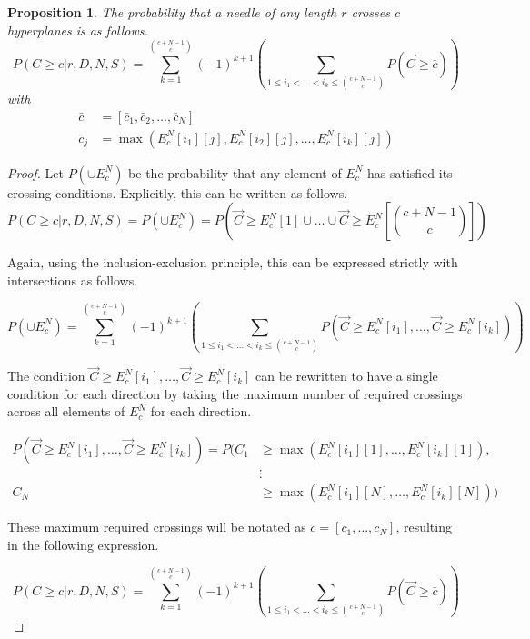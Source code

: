 \documentclass{article}
\newtheorem{proposition}{Proposition}
\begin{document}
\begin{proposition} \label{p:inclusive-exclusive needle crossing}
	The probability that a needle of any length $r$ crosses $c$ hyperplanes is as follows.
	\begin{equation}
		P(C\ge c|r,D,N,S) = \sum_{k=1}^{c+N-1\choose c} (-1)^{k+1}\left(\sum_{1\le i_1 < \hdots < i_k \le {c+N-1\choose c}}P(\vec{C}\ge\bar{c}) \right)
	\end{equation}
	with
	\begin{align}
		\bar{c}&=[\bar{c}_1, \bar{c}_2, \hdots, \bar{c}_N] \\
		\bar{c}_j &= \max(E_c^N[i_1][j], E_c^N[i_2][j], \hdots, E_c^N[i_k][j])
	\end{align}
\end{proposition}
\begin{proof}
	Let $P(\cup E_c^N)$ be the probability that any element of $E_c^N$ has satisfied its crossing conditions.
	Explicitly, this can be written as follows.
	\begin{equation}
		P(C\ge c|r, D, N, S) = P(\cup E_c^N) = P\left(\vec{C} \ge E_c^N[1] \cup \hdots \cup \vec{C} \ge E_c^N\left[{c+N-1 \choose c}\right]\right)
	\end{equation}

	Again, using the inclusion-exclusion principle, this can be expressed strictly with intersections as follows.

	\begin{equation}
		P(\cup E_c^N) = \sum_{k=1}^{c+N-1\choose c} (-1)^{k+1}\left(\sum_{1\le i_1 < \hdots < i_k \le {c+N-1\choose c}}P(\vec{C}\ge E_c^N[i_1] , \hdots , \vec{C}\ge E_c^N[i_k]) \right)
	\end{equation}

	The condition $\vec{C}\ge E_c^N[i_1], \hdots , \vec{C}\ge E_c^N[i_k]$ can be rewritten to have a single
	condition for each direction by taking the maximum number of required crossings across all elements of $E_c^N$
	for each direction.

	\begin{align}
		P(\vec{C}\ge E_c^N[i_1], \hdots , \vec{C}\ge E_c^N[i_k]) = P\bigg(C_1 &\ge \max(E_c^N[i_1][1], \hdots, E_c^N[i_k][1]), \nonumber \\
			&\vdots \nonumber \\
			C_N &\ge \max(E_c^N[i_1][N], \hdots, E_c^N[i_k][N])\bigg)
	\end{align}

	These maximum required crossings will be notated as $\bar{c} = [\bar{c}_1,\hdots,\bar{c}_N]$, resulting in
	the following expression.

	\begin{equation}
		P(C\ge c|r,D,N,S) = \sum_{k=1}^{c+N-1\choose c} (-1)^{k+1}\left(\sum_{1\le i_1 < \hdots < i_k \le {c+N-1\choose c}}P(\vec{C}\ge\bar{c}) \right) \label{eq:combo probs}
	\end{equation}
\end{proof}
\end{document}
